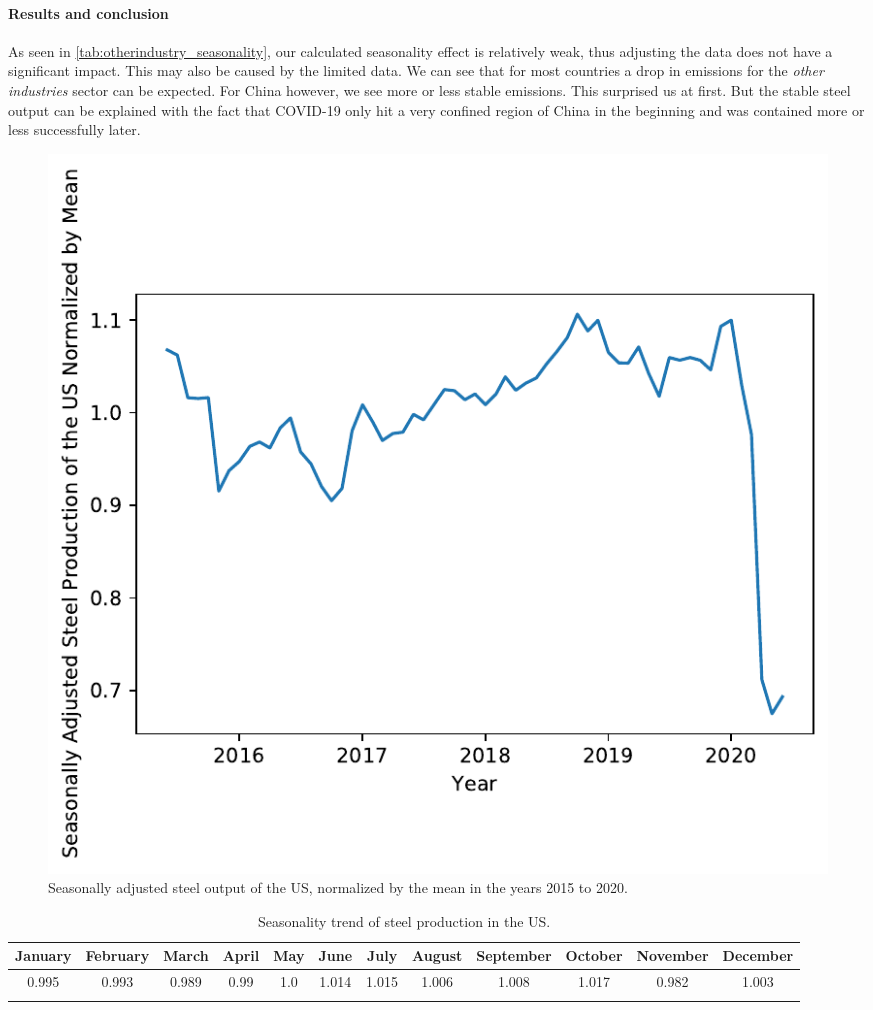 \paragraph{Results and conclusion}
As seen in \autoref{tab:otherindustry_seasonality}, our calculated seasonality effect is relatively weak, thus adjusting the data does not have a significant impact. This may also be caused by the limited data.
We can see that for most countries a drop in \co emissions for the \textit{other industries} sector can be expected. For China however, we see more or less stable emissions. This surprised us at first. But the stable steel output can be explained with the fact that COVID-19 only hit a very confined region of China in the beginning and was contained more or less successfully later.

\begin{figure}[hbt]
	\centering
	\includegraphics[width=0.69\linewidth]{../predictions/steelUS_seasonadjusted.pdf}
	\caption{Seasonally adjusted steel output of the US, normalized by the mean in the years 2015 to 2020.}
	\label{fig:steelUS_adjusted}
\end{figure}


\begin{table}[h!]
	\centering
	\begin{tabular}{cccccccccccc}
		\hline
		January & February & March & April & May & June & July & August & September & October & November & December\\
		\hline
		\hline
		0.995 & 0.993 & 0.989 & 0.99 & 1.0 & 1.014 & 1.015 & 1.006 & 1.008 & 1.017 & 0.982 & 1.003\\
		\hline &&&&&&&&&&& \\
	\end{tabular}
	\caption{Seasonality trend of steel production in the US.}%
	\label{tab:otherindustry_seasonality}
\end{table}

